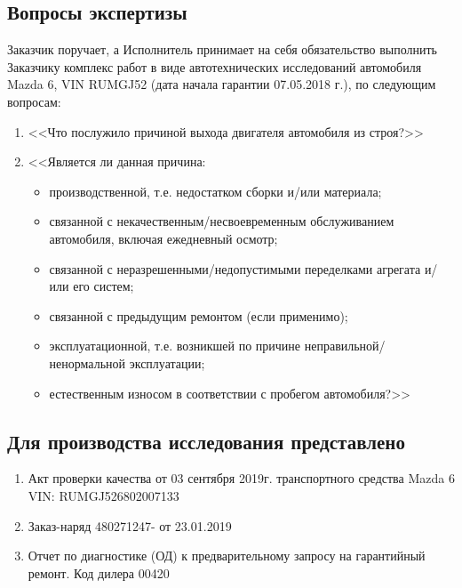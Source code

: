 \setcounter{page}{1}

%
%
\subsection{Вопросы экспертизы}
Заказчик поручает, а Исполнитель принимает на себя обязательство выполнить Заказчику  комплекс работ в виде автотехнических исследований автомобиля Mazda 6, VIN RUMGJ52 (дата начала гарантии 07.05.2018 г.), по следующим вопросам:
\begin{enumerate}\item  <<Что послужило причиной выхода двигателя автомобиля из строя?>>	
	\item  <<Является ли данная причина:\begin{itemize}
		\item производственной, т.е. недостатком сборки и/или материала;
	\item связанной с некачественным/несвоевременным обслуживанием автомобиля, включая ежедневный осмотр;
\item связанной с неразрешенными/недопустимыми переделками агрегата и/или его систем;
\item связанной с предыдущим ремонтом (если применимо);
\item эксплуатационной, т.е. возникшей по причине неправильной/ненормальной эксплуатации;
\item  естественным износом в соответствии с пробегом автомобиля?>> 
	\end{itemize}
%	
\end{enumerate}
\subsection{Для производства исследования представлено} %
\begin{enumerate}
	\item Акт проверки качества от 03 сентября 2019г. транспортного средства Mazda 6 VIN: RUMGJ526802007133 
	\item  Заказ-наряд 480271247- от 23.01.2019
	\item Отчет по диагностике (ОД) к предварительному запросу на гарантийный ремонт. Код дилера 00420
	\end{enumerate}
%
%
%


